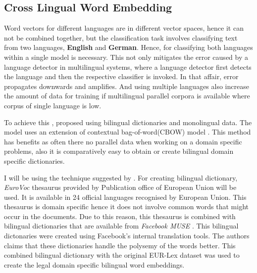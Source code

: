 \subsection{Cross Lingual Word Embedding}
Word vectors for different languages are in different vector spaces, hence it can not be combined together, but the classification task involves classifying text from two languages, \textbf{English} and \textbf{German}. Hence, for classifying both languages within a single model is necessary. This not only mitigates the error caused by a language detector in multilingual systems, where a language detector first detects the language and then the respective classifier is invoked. In that affair, error propagates downwards and amplifies. And using multiple languages also increase the amount of data for training if multilingual parallel corpora is available where corpus of single language is low. 

To achieve this \cite{duong2016learning}, proposed using bilingual dictionaries and monolingual data. The model uses an extension of contextual bag-of-word(CBOW) model \cite{mikolov2013efficient}. This method has benefits as often there no parallel data when working on a domain specific problems, also it is comparatively easy to obtain or create bilingual domain specific dictionaries. 

I will be using the technique suggested by \cite{duong2016learning}. For creating bilingual dictionary, \textit{EuroVoc} thesaurus \cite{steinberger2002cross} provided by Publication office of European Union will be used. It is available in 24 official languages recognised by European Union. This thesaurus is domain specific hence it does not involve common words that might occur in the documents. Due to this reason, this thesaurus is combined with bilingual dictionaries that are available from \textit{Facebook MUSE} \cite{conneau2017word}. This bilingual dictonaries were created using Facebook's internal translation tools. The authors claims that these dictionaries handle the polysemy of the words better. This combined bilingual dictionary with the original EUR-Lex dataset was used to create the legal domain specific bilingual word embeddings. 

